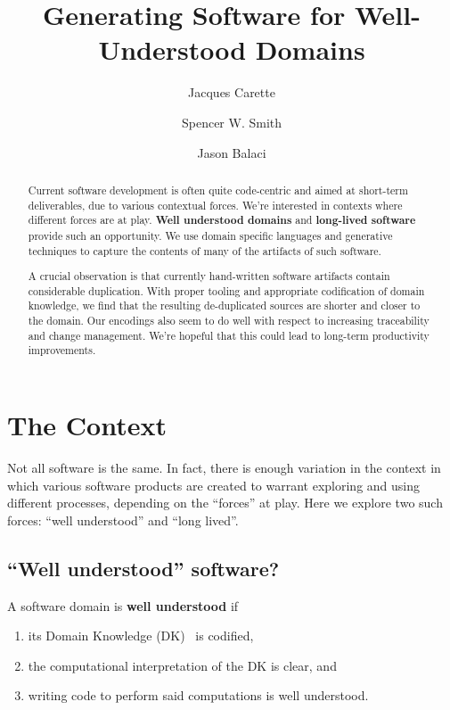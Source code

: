 \documentclass[a4paper,UKenglish,cleveref,autoref,thm-restate]{oasics-v2021}
\title{Generating Software for Well-Understood Domains}
\author{Jacques Carette}{Department of Computing and Software, McMaster University, 1280 Main Street West, Hamilton, Ontario, L8S 4L8, Canada \and \url{https://www.cas.mcmaster.ca/~carette/} }{carette@mcmaster.ca}{https://orcid.org/0000-0001-8993-9804}{}
\author{Spencer W. Smith}{Department of Computing and Software, McMaster University, 1280 Main Street West, Hamilton, Ontario, L8S 4L8, Canada \and \url{https://www.cas.mcmaster.ca/~smiths/} }{smiths@mcmaster.ca}{https://orcid.org/0000-0002-0760-0987}{}
\author{Jason Balaci}{Department of Computing and Software, McMaster University, 1280 Main Street West, Hamilton, Ontario, L8S 4L8, Canada}{balacij@mcmaster.ca}{}{}
\begin{document}
\maketitle

\begin{abstract}
    Current software development is often quite code-centric and aimed at
    short-term deliverables, due to various contextual forces. We're interested
    in contexts where different forces are at play.  \textbf{Well understood
    domains} and \textbf{long-lived software} provide such an opportunity. We
    use domain specific languages and generative techniques to capture the
    contents of many of the artifacts of such software.
  
    A crucial observation is that currently hand-written software artifacts
    contain considerable duplication. With proper tooling and
    appropriate codification of domain knowledge, we find that the resulting
    de-duplicated sources are shorter and closer to the domain. Our encodings
    also seem to do well with respect to increasing traceability and change
    management. We're hopeful that this could lead to long-term productivity
    improvements.
\end{abstract}

\section{The Context}
\label{sec:the-context}

Not all software is the same. In fact, there is enough variation in the
context in which various software products are created to warrant exploring
and using different processes, depending on the ``forces'' at play. Here
we explore two such forces: ``well understood'' and ``long lived''.

\subsection{``Well understood'' software?}
\label{subsec:well-understood}

\begin{definition}
\label{defn:well-understood}
A software domain is \textbf{well understood} if
\begin{enumerate}
    \item its Domain Knowledge (DK)~\cite{bjorner2021domaineng} is codified,
    \item the computational interpretation of the DK is clear, and
    \item writing code to perform said computations is well understood.
\end{enumerate}
\end{definition}
\end{document}
